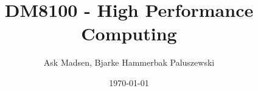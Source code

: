 \documentclass{beamer}					%
\title{DM8100 - High Performance Computing}	    %
\author{Ask Madsen, Bjarke Hammerbak Paluszewski}								%
\institute{University of Southern Denmark}					%
\date{\today}									%
\begin{document}
\begin{frame}
  \titlepage
\end{frame}



%









\end{document}
